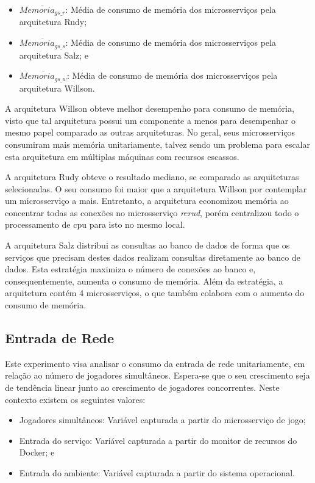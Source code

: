 \begin{itemize}
\item $\overline{Memoria_{gs\_r}}$: Média de consumo de memória dos microsserviços pela arquitetura Rudy;
\item $\overline{Memoria_{gs\_s}}$: Média de consumo de memória dos microsserviços pela arquitetura Salz; e
\item $\overline{Memoria_{gs\_w}}$: Média de consumo de memória dos microsserviços pela arquitetura Willson.
\end{itemize}

A arquitetura Willson obteve melhor desempenho para consumo de memória, visto que tal arquitetura possui um componente a menos para desempenhar o mesmo papel comparado as outras arquiteturas.
%
No geral, seus microsserviços consumiram mais memória unitariamente, talvez sendo um problema para escalar esta arquitetura em múltiplas máquinas com recursos escassos.

A arquitetura Rudy obteve o resultado mediano, se comparado as arquiteturas selecionadas.
%
O seu consumo foi maior que a arquitetura Willson por contemplar um microsserviço a mais.
%
Entretanto, a arquitetura economizou memória ao concentrar todas as conexões no microsserviço \textit{rcrud}, porém centralizou todo o processamento de \ac{cpu} para isto no mesmo local.

A arquitetura Salz distribui as consultas ao banco de dados de forma que os serviços que precisam destes dados realizam consultas diretamente ao banco de dados.
%
Esta estratégia maximiza o número de conexões ao banco e, consequentemente, aumenta o consumo de memória.
%
Além da estratégia, a arquitetura contém 4 microsserviços, o que também colabora com o aumento do consumo de memória.


\subsection{Entrada de Rede}

Este experimento visa analisar o consumo da entrada de rede unitariamente, em relação ao número de jogadores simultâneos.
%
Espera-se que o seu crescimento seja de tendência linear junto ao crescimento de jogadores concorrentes.
%
Neste contexto existem os seguintes valores:

\begin{itemize}
    \item Jogadores simultâneos: Variável capturada a partir do microsserviço de jogo;
    \item Entrada do serviço: Variável capturada a partir do monitor de recursos do Docker; e
    \item Entrada do ambiente: Variável capturada a partir do sistema operacional.
\end{itemize}

